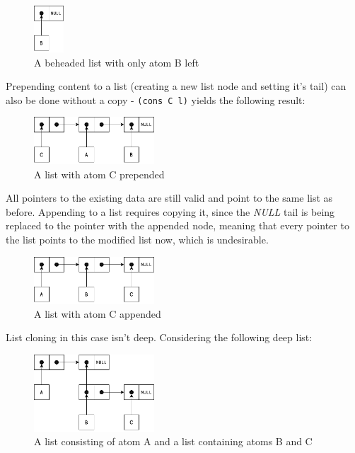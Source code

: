 \begin{figure}[H]
\centering
\includegraphics[width=0.1\textwidth]{figures/plist_3.png}
\caption{A beheaded list with only atom B left}
\end{figure}

\par Prepending content to a list (creating a new list node and setting it's tail) can also be done without a copy - \verb|(cons C l)| yields the following result:

\begin{figure}[H]
\centering
\includegraphics[width=0.4\textwidth]{figures/plist_2.png}
\caption{A list with atom C prepended}
\end{figure}

\par All pointers to the existing data are still valid and point to the same list as before. Appending to a list requires copying it, since the \textit{NULL} tail is being replaced to the pointer with the appended node, meaning that every pointer to the list points to the modified list now, which is undesirable.

\begin{figure}[H]
\centering
\includegraphics[width=0.4\textwidth]{figures/plist_4.png}
\caption{A list with atom C appended}
\end{figure}

\par List cloning in this case isn't deep. Considering the following deep list:

\begin{figure}[H]
\centering
\includegraphics[width=0.4\textwidth]{figures/plist_6.png}
\caption{A list consisting of atom A and a list containing atoms B and C}
\end{figure}


